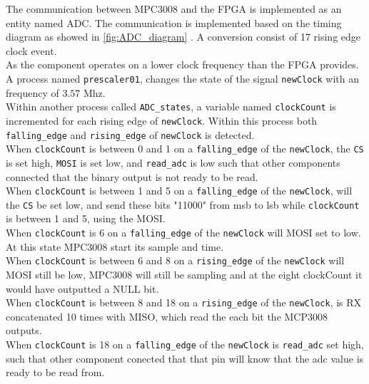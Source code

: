 The communication between MPC3008 and the FPGA is implemented as an entity named ADC. The communication is implemented based on the timing diagram as showed in \ref{fig:ADC_diagram} .  A conversion  consist of 17 rising edge clock event.  \\

As the component operates on a lower clock frequency than the FPGA provides. A process named \texttt{prescaler01}, changes the state of the signal \texttt{newClock} with an frequency of $3.57$ Mhz. \\

Within another process called \texttt{ADC\_states},  a variable named \texttt{clockCount} is incremented for each rising edge of \texttt{newClock}.  Within this process  both \texttt{falling\_edge} and \texttt{rising\_edge} of \texttt{newClock} is detected. \\

When \texttt{clockCount} is between 0 and 1 on a \texttt{falling\_edge} of the \texttt{newClock}, the \texttt{CS} is set high, \texttt{MOSI} is set low, and \texttt{read\_adc} is low such that other components connected that the binary output is not ready to be read. \\

When \texttt{clockCount} is between 1 and 5 on a \texttt{falling\_edge} of the \texttt{newClock}, will the \texttt{CS} be set low, and send  these bits "11000" from msb to lsb while \texttt{clockCount} is between 1 and 5, using  the MOSI.  \\

When \texttt{clockCount} is 6 on a \texttt{falling\_edge} of the \texttt{newClock} will MOSI  set to low. At this state MPC3008 start its sample and time. \\



When \texttt{clockCount} is between 6 and 8 on a \texttt{rising\_edge} of the \texttt{newClock} will MOSI still be low, MPC3008  will still be sampling and at the eight clockCount it would have outputted  a NULL bit. \\

When \texttt{clockCount} is between 8  and 18 on a \texttt{rising\_edge} of the \texttt{newClock}, is RX concatenated 10 times with MISO, which read the each bit the MCP3008 outputs.\\

When \texttt{clockCount} is 18 on a \texttt{falling\_edge} of the \texttt{newClock} is \texttt{read\_adc} set high, such that other component conected that that pin will know that the adc value is ready to be read from. \\

